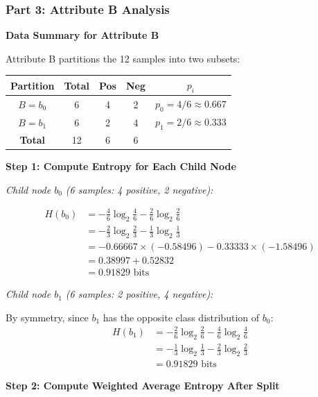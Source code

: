 \documentclass[12pt]{article}
\begin{document}
\subsubsection{Part 3: Attribute B Analysis}

\begin{solution}
\textbf{Data Summary for Attribute B}

Attribute B partitions the 12 samples into two subsets:

\begin{center}
\begin{tabular}{|c|c|c|c|c|}
\hline
\textbf{Partition} & \textbf{Total} & \textbf{Pos} & \textbf{Neg} & \textbf{$p_i$} \\
\hline
$B = b_0$ & 6 & 4 & 2 & $p_0 = 4/6 \approx 0.667$ \\
$B = b_1$ & 6 & 2 & 4 & $p_1 = 2/6 \approx 0.333$ \\
\hline
\textbf{Total} & 12 & 6 & 6 & \\
\hline
\end{tabular}
\end{center}

\textbf{Step 1: Compute Entropy for Each Child Node}

\textit{Child node $b_0$ (6 samples: 4 positive, 2 negative):}

\begin{align*}
H(b_0) &= -\frac{4}{6} \log_2 \frac{4}{6} - \frac{2}{6} \log_2 \frac{2}{6} \\
&= -\frac{2}{3} \log_2 \frac{2}{3} - \frac{1}{3} \log_2 \frac{1}{3} \\
&= -0.66667 \times (-0.58496) - 0.33333 \times (-1.58496) \\
&= 0.38997 + 0.52832 \\
&= 0.91829 \text{ bits}
\end{align*}

\textit{Child node $b_1$ (6 samples: 2 positive, 4 negative):}

By symmetry, since $b_1$ has the opposite class distribution of $b_0$:
\begin{align*}
H(b_1) &= -\frac{2}{6} \log_2 \frac{2}{6} - \frac{4}{6} \log_2 \frac{4}{6} \\
&= -\frac{1}{3} \log_2 \frac{1}{3} - \frac{2}{3} \log_2 \frac{2}{3} \\
&= 0.91829 \text{ bits}
\end{align*}

\textbf{Step 2: Compute Weighted Average Entropy After Split}


\end{solution}
\end{document}
